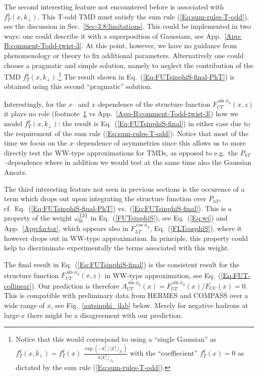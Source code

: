\documentclass[a4paper,11pt]{article}
\newcommand{\la}{\langle}
\newcommand{\ra}{\rangle}
\def\Phperp{P_{hT}}
\def\kperp{k_\perp}
\begin{document}
The second interesting feature not encountered before is 
associated with $f_T^q(x,\kperp)$. This T-odd TMD must 
satisfy the sum rule (\ref{Eq:sum-rules-T-odd}), see the
discussion in Sec.~\ref{Sec-3.8:limitations}. This could be
implemented in two ways: one could describe it with a superposition 
of Gaussians, see App.~\ref{App-B:comment-Todd-twist-3}.
At this point, however, we have no guidance from phenomenology or theory 
to fix additional parameters. Alternatively one could choose a pragmatic 
and simple solution, namely to neglect the contribution of the TMD
$f_T^q(x,\kperp)$.\footnote{\label{Footnote:fT-single-Gauss} Notice 
	that this would correspond to using a ``single Gaussian'' as 
	$f_T^q(x,\kperp) = f_T^q(x)\;
	\frac{\exp(-\kperp^2/\la\kperp^2\ra_{f_T}^{ })}
	{\pi\la\kperp^2\ra_{f_T}^{ }}$
	with the ``coeffiecient'' $f_T^q(x)=0$ as dictated 
	by the sum rule (\ref{Eq:sum-rules-T-odd}).}
The result shown in Eq.~(\ref{Eq:FUTsinphiS-final-PhT})
is obtained using this second ``pragmatic'' solution.

Interestingly, for the $x$-- and $z$--dependence of the
structure function $F_{UT}^{\sin\phi_S}(x,z)$ it plays no role
(footnote~\ref{Footnote:fT-single-Gauss} 
vs App.~\ref{App-B:comment-Todd-twist-3}) how we model $f_T^q(x,\kperp)$: 
the result is Eq.~(\ref{Eq:FUTsinphiS-final}) in either case due to the 
requirement of the sum rule (\ref{Eq:sum-rules-T-odd}).
Notice that most of the time we focus on the $x$--dependence of 
asymmetries since this allows us to more directly test the WW-type 
approximations for TMDs, as opposed to e.g.\ the $P_{hT}$--dependence 
where in addition we would test at the same time also the Gaussian Ansatz.

The third interesting feature not seen in
previous sections is the occurence of a term which
drops out upon integrating the structure function over $\Phperp$, cf.\ 
Eq.~(\ref{Eq:FUTsinphiS-final-PhT}) vs.\ (\ref{Eq:FUTsinphiS-final}).
This is a property of the weight $\omega^{\{2\}}_{\rm B}$ 
in Eq.~(\ref{FUTsinphiS}),
see Eq.~(\ref{Eq:wi}) and App.~\ref{App:factor}, which appears
also in $F_{LT}^{\cos\phi_S}$, Eq.~(\ref{FLTcosphiS}), where it however drops
out in WW-type approximation. In principle, this property could  help to 
discriminate experimentally the terms associated with this weight.

The final result in Eq.~(\ref{Eq:FUTsinphiS-final}) is the
consistent result for the structure function $F_{UT}^{\sin\phi_S}(x,z)$ in 
WW-type approximation, see Eq.~(\ref{Eq:FUT-collinear}). Our prediction 
is therefore $A_{UT}^{\sin\phi_S}(x)=F_{UT}^{\sin\phi_S}(x)/F_{UU}(x)=0$.
This is compatible with preliminary data from HERMES \cite{Schnell:2010zza}
and COMPASS \cite{Parsamyan:2015dfa} over a wide range of $x$, see 
Fig.~\ref{autsinphi_jlab} below. Merely for negative hadrons at 
large-$x$ there might be a disagreement with our prediction.
\end{document}
